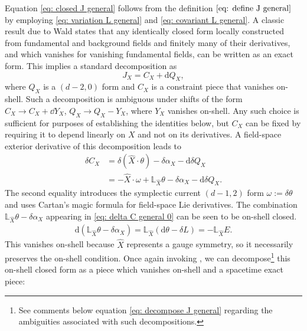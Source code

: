 \documentclass[]{jkpaper}
\theoremstyle{plain}
\theoremstyle{definition}
\def\extd{\mathrm {d}}
\newcommand{\fL}{\mathbb{L}}
\begin{document}
Equation \eqref{eq: closed J general} follows from the definition $\eqref{eq: define J general}$ by employing \eqref{eq: variation L general} and \eqref{eq: covariant L general}. A classic result due to Wald \cite{Wald:1990mme} states that any identically closed form locally constructed from fundamental and background fields and finitely many of their derivatives, and which vanishes for vanishing fundamental fields, can be written as an exact form.  This implies a standard decomposition as
\begin{equation}\label{eq: decompose J general}
    J_X=C_X + \extd Q_X,
\end{equation}
where $Q_X$ is a $(d-2,0)$ form and $C_X$ is a constraint piece that vanishes on-shell. Such a decomposition is ambiguous under shifts of the form $C_X\to C_X+\dd{Y}_X$, $Q_X \to Q_X-Y_X$, where $Y_X$ vanishes on-shell. Any such choice is sufficient for purposes of establishing the identities below, but $C_X$ can be fixed by requiring it to depend  linearly on $X$ and not on its derivatives.
A field-space exterior derivative of this decomposition leads to
\begin{equation}\begin{split}\label{eq: delta C general 0}
    \delta C_{X} &=\delta(\hat{X}\cdot \theta) - \delta \alpha_{X} -\extd \delta Q_{X} \\
    &=-\hat{X}\cdot \omega + \fL_{\hat{X}}\theta-\delta \alpha_{X}-\extd\delta Q_{X}.
\end{split}\end{equation}
The second equality introduces the symplectic current $(d-1,2)$ form $\omega:=\delta \theta$ and uses Cartan's magic formula for field-space Lie derivatives.
The combination $\fL_{\hat{X}}\theta-\delta \alpha_{X}$ appearing in \eqref{eq: delta C general 0} can be seen to be on-shell closed.
\begin{equation}\begin{split}\label{eq: on-shell closed combination}
    \extd(\fL_{\hat{X}}\theta-\delta \alpha_{X})
    =\fL_{\hat{X}}(\extd\theta - \delta L) = -\fL_{\hat{X}} E.
\end{split}\end{equation}
This vanishes on-shell because $\hat{X}$ represents a gauge symmetry, so it necessarily preserves the on-shell condition.
Once again invoking \cite{Wald:1990mme}, we can decompose\footnote{See comments below equation \eqref{eq: decompose J general} regarding the ambiguities associated with such decompositions.} this on-shell closed form as a piece which vanishes on-shell and a spacetime exact piece:
\end{document}
